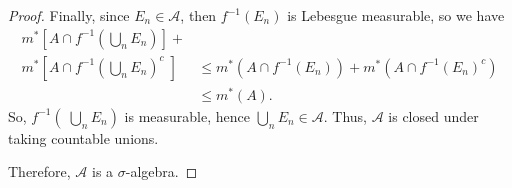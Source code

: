 \documentclass{article}
\begin{document}
\begin{proof}
	Finally, since $E_n \in \mathcal{A}$, then $f^{-1}(E_n)$ is Lebesgue measurable, so we have 
	\begin{align}
		m^*\left[A\cap f^{-1}\left(\bigcup_n E_n\right)\right] + \nonumber \\ m^*\left[A\cap f^{-1}\left(\bigcup_n E_n\right)^c \; \right]
		&\leq m^*\left(A\cap f^{-1}(E_n)\right) + m^*(A\cap f^{-1}(E_n)^c) \\
		&\leq m^*(A).
	\end{align}
	So, $f^{-1}\left(\; \bigcup_n E_n\right)$ is measurable, hence $\bigcup_n E_n \in \mathcal{A}$. Thus, $\mathcal{A}$ is closed under taking countable unions.
	
	Therefore, $\mathcal{A}$ is a $\sigma$-algebra.
\end{proof}
\end{document}
